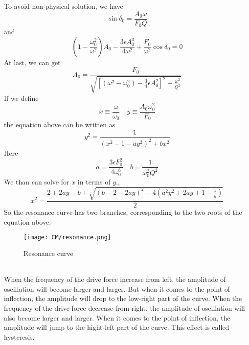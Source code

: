 \documentclass[cyan]{elegantnote}
\begin{document}
To avoid non-physical solution, we have
\[\sin\delta_0 = \frac{A_0 \omega}{F_0 Q}\]
and
\[\left ( 1 - \frac{\omega_0^2}{\omega^2}\right ) A_0 - \frac{3\epsilon A_0^3}{4\omega^2} + \frac{F_0}{\omega^2}\cos\delta_0 = 0\]
At last, we can get
\[A_0 = \frac{F_0}{\sqrt{\left[ (\omega^2 -\omega_0^2) - \frac{3}{4}\epsilon A_0^2 \right ]^2 + \frac{\omega^2}{Q^2} }}\]
If we define
\[x \equiv \frac{\omega}{\omega_0} \quad y \equiv \frac{A_0 \omega_0^2}{F_0}\]
the equation above can be written as
\[y^2 = \frac{1}{(x^2-1-ay^2)^2 + bx^2}\]
Here
\[a = \frac{3\epsilon F_0^2}{4\omega_0^6} \quad b = \frac{1}{\omega_0^2 Q^2}\]
We than can solve for $x$ in terms of $y$.,
\[x^2 = \frac{2 + 2ay-b \pm \sqrt{(b-2-2ay)^2-4(a^2y^2+2ay+1-\frac{1}{y})}}{2}\]
So the resonance curve has two branches, corresponding to the two roots of the equation above.
\begin{figure}[!h]
	\centering
	\texttt{[image: CM/resonance.png]}
	\caption{Resonance curve}
\end{figure}\\ 
When the frequency of the drive force increase from left, the amplitude of oscillation will become larger and larger. But when it comes to the point of inflection, the amplitude will drop to the low-right part of the curve. 
When the frequency of the drive force decrease from right, the amplitude of oscillation will also become larger and larger. When it comes to the point of inflection, the amplitude will jump to the hight-left part of the curve. 
This effect is called hysteresis.
\end{document}
